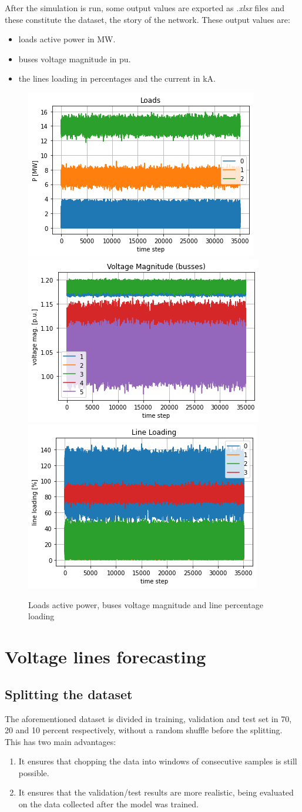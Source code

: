 After the simulation is run, some output values are exported as \emph{.xlsx} files and these constitute the dataset, the story of the network. These output values are:
\begin{itemize}
    \item loads active power in MW.
    \item buses voltage magnitude in \gls{pu}.
    \item the lines loading in percentages and the current in kA.
\end{itemize}

\begin{figure}[h]
    \centering
    \includegraphics[width=.32\linewidth]{images/GYM-ANM/DATASET PLOTS/loads.png}
    \includegraphics[width=.32\linewidth]{images/GYM-ANM/DATASET PLOTS/VM.png}
    \includegraphics[width=.32\linewidth]{images/GYM-ANM/DATASET PLOTS/LL.png}
    \caption[GYM-ANM datasets]{Loads active power, buses voltage magnitude and line percentage loading}
    \label{fig:net_sit3}
\end{figure}
    
    
\section{Voltage lines forecasting}
\subsection{Splitting the dataset}
The aforementioned dataset is divided in training, validation and test set in 70, 20 and 10 percent respectively, without a random shuffle before the splitting. This has two main advantages:
\begin{enumerate}
    \item It ensures that chopping the data into windows of consecutive samples is still possible.
    \item It ensures that the validation/test results are more realistic, being evaluated on the data collected after the model was trained.
\end{enumerate}

